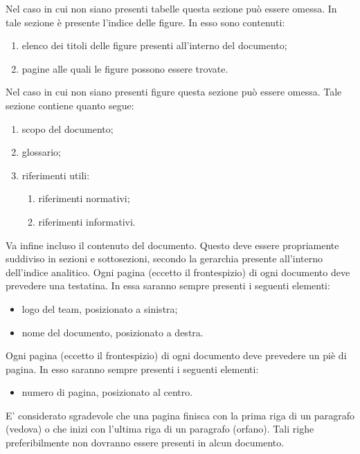					Nel caso in cui non siano presenti tabelle questa sezione può essere omessa.
					In tale sezione è presente l’indice delle figure. In esso sono contenuti:
					\begin{enumerate}
						\item elenco dei titoli delle figure presenti all’interno del documento;
						\item pagine alle quali le figure possono essere trovate.
					\end{enumerate}
					Nel caso in cui non siano presenti figure questa sezione può essere omessa.
					Tale sezione contiene quanto segue:
					\begin{enumerate}
						\item scopo del documento;
						\item glossario;
						\item riferimenti utili:
						\begin{enumerate}
							\item riferimenti normativi;
							\item riferimenti informativi.
						\end{enumerate}
					\end{enumerate}
					Va infine incluso il contenuto del documento. Questo deve essere propriamente suddiviso in sezioni e sottosezioni, secondo la gerarchia presente all’interno dell’indice analitico.
						Ogni pagina (eccetto il frontespizio) di ogni documento deve prevedere una testatina. In essa saranno sempre presenti i seguenti elementi:
						\begin{itemize}
							\item logo del team, posizionato a sinistra;
							\item nome del documento, posizionato a destra.
						\end{itemize}
						Ogni pagina (eccetto il frontespizio) di ogni documento deve prevedere un piè di pagina. In esso saranno sempre presenti i seguenti elementi:
						\begin{itemize}
							\item numero di pagina, posizionato al centro.
						\end{itemize}
						E’ considerato sgradevole che una pagina finisca con la prima riga di un paragrafo (vedova) o che inizi con l’ultima riga di un paragrafo (orfano). Tali righe preferibilmente non dovranno essere presenti in alcun documento.
